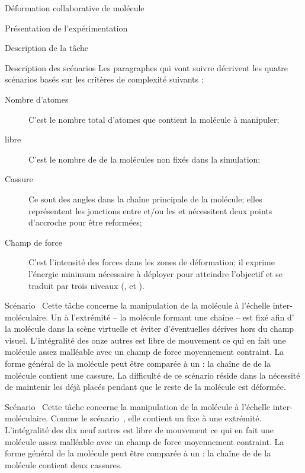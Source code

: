 \documentclass[myfrancais]{mythesis}
\begin{document}
\begin{mychapter}{Déformation collaborative de molécule}
\begin{mysection}{Présentation de l'expérimentation}
\begin{mysubsection}{Description de la tâche}
\begin{mysubsubsection}{Description des scénarios}
					Les paragraphes qui vont suivre décrivent les quatre scénarios basés sur les critères de complexité suivants :
					\begin{description}
						\item[Nombre d'atomes] C'est le nombre total d'atomes que contient la molécule à manipuler;
						\item[ libre] C'est le nombre de  de la molécules non fixés dans la simulation;
						\item[Cassure] Ce sont des angles dans la chaîne principale de la molécule; elles représentent les jonctions entre \myhelice* et/ou les \myfeuillet* et nécessitent deux points d'accroche pour être reformées;
						\item[Champ de force] C'est l'intensité des forces dans les zones de déformation; il exprime l'énergie minimum nécessaire à déployer pour atteindre l'objectif et se traduit par trois niveaux (,  et ).
					\end{description}
					\begin{myparagraph}{Scénario~}
						Cette tâche concerne la manipulation de la molécule \myTRPZIPPER à l'échelle inter-moléculaire.
						Un  à l'extrémité -- la molécule formant une chaîne -- est fixé afin d' la molécule dans la scène virtuelle et éviter d'éventuelles dérives hors du champ visuel.
						L'intégralité des onze autres  est libre de mouvement ce qui en fait une molécule assez malléable avec un champ de force moyennement contraint.
						La forme général de la molécule peut être comparée à un  : la chaîne de  de la molécule contient une cassure.
						La difficulté de ce scénario réside dans la nécessité de maintenir les  déjà placés pendant que le reste de la molécule est déformée.
					\end{myparagraph}
					\begin{myparagraph}{Scénario~}
						Cette tâche concerne la manipulation de la molécule \myTRPCAGE à l'échelle inter-moléculaire.
						Comme le scénario~, elle contient un  fixe à une extrémité.
						L'intégralité des dix neuf autres  est libre de mouvement ce qui en fait une molécule assez malléable avec un champ de force moyennement contraint.
						La forme général de la molécule peut être comparée à un  : la chaîne de  de la molécule contient deux cassures.

\end{myparagraph}
\end{mysubsubsection}
\end{mysubsection}
\end{mysection}
\end{mychapter}
\end{document}
